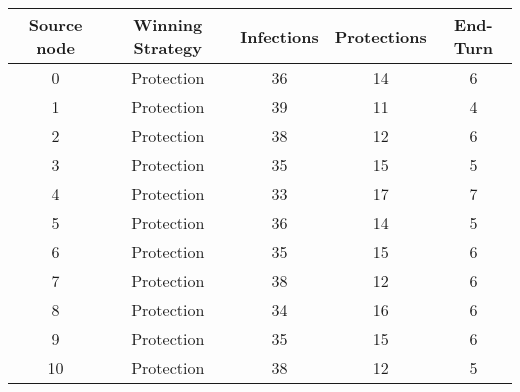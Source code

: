 \documentclass[results.tex]{subfiles}
\begin{document}
    \begin{center}
        \begin{tabular}{| c || c | c | c | c |}
            \hline
            {\bfseries Source node} & {\bfseries Winning Strategy} & {\bfseries Infections} & {\bfseries Protections}
            & {\bfseries End-Turn}
            \\  %
            \hline\hline
            0                       & Protection                   & 36                     & 14                      & 6                    \\
            \hline
            1                       & Protection                   & 39                     & 11                      & 4                    \\
            \hline
            2                       & Protection                   & 38                     & 12                      & 6                    \\
            \hline
            3                       & Protection                   & 35                     & 15                      & 5                    \\
            \hline
            4                       & Protection                   & 33                     & 17                      & 7                    \\
            \hline
            5                       & Protection                   & 36                     & 14                      & 5                    \\
            \hline
            6                       & Protection                   & 35                     & 15                      & 6                    \\
            \hline
            7                       & Protection                   & 38                     & 12                      & 6                    \\
            \hline
            8                       & Protection                   & 34                     & 16                      & 6                    \\
            \hline
            9                       & Protection                   & 35                     & 15                      & 6                    \\
            \hline
            10                      & Protection                   & 38                     & 12                      & 5                    \\

\end{tabular}
\end{center}
\end{document}

